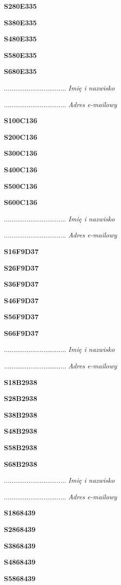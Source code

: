 \Large \textbf{S280E335}

\Large \textbf{S380E335}

\Large \textbf{S480E335}

\Large \textbf{S580E335}

\Large \textbf{S680E335}

.................................
\textit{Imię i nazwisko}

.................................
\textit{Adres e-mailowy}

\Large \textbf{S100C136}

\Large \textbf{S200C136}

\Large \textbf{S300C136}

\Large \textbf{S400C136}

\Large \textbf{S500C136}

\Large \textbf{S600C136}

.................................
\textit{Imię i nazwisko}

.................................
\textit{Adres e-mailowy}

\Large \textbf{S16F9D37}

\Large \textbf{S26F9D37}

\Large \textbf{S36F9D37}

\Large \textbf{S46F9D37}

\Large \textbf{S56F9D37}

\Large \textbf{S66F9D37}

.................................
\textit{Imię i nazwisko}

.................................
\textit{Adres e-mailowy}

\Large \textbf{S18B2938}

\Large \textbf{S28B2938}

\Large \textbf{S38B2938}

\Large \textbf{S48B2938}

\Large \textbf{S58B2938}

\Large \textbf{S68B2938}

.................................
\textit{Imię i nazwisko}

.................................
\textit{Adres e-mailowy}

\Large \textbf{S1868439}

\Large \textbf{S2868439}

\Large \textbf{S3868439}

\Large \textbf{S4868439}

\Large \textbf{S5868439}

